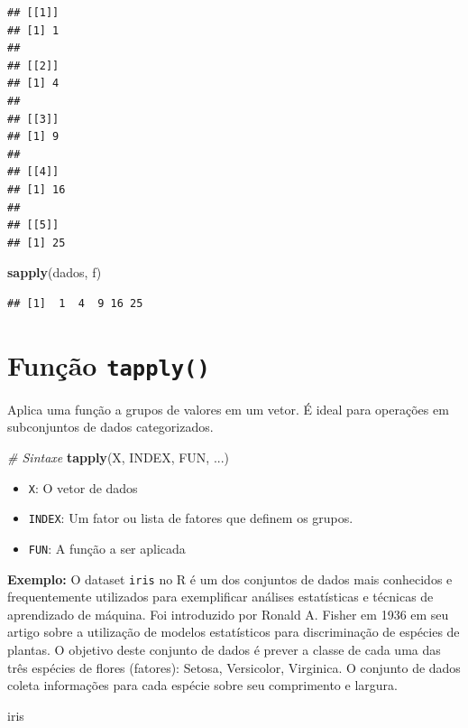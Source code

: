 \documentclass[
]{book}
\newenvironment{Shaded}{\begin{snugshade}}{\end{snugshade}}
\newcommand{\CommentTok}[1]{\textcolor[rgb]{0.56,0.35,0.01}{\textit{#1}}}
\newcommand{\FunctionTok}[1]{\textcolor[rgb]{0.13,0.29,0.53}{\textbf{#1}}}
\newcommand{\NormalTok}[1]{#1}
\begin{document}
\begin{verbatim}
## [[1]]
## [1] 1
## 
## [[2]]
## [1] 4
## 
## [[3]]
## [1] 9
## 
## [[4]]
## [1] 16
## 
## [[5]]
## [1] 25
\end{verbatim}

\begin{Shaded}
\begin{Highlighting}[]
\FunctionTok{sapply}\NormalTok{(dados, f)}
\end{Highlighting}
\end{Shaded}

\begin{verbatim}
## [1]  1  4  9 16 25
\end{verbatim}

\section{\texorpdfstring{Função \texttt{tapply()}}{Função tapply()}}\label{funuxe7uxe3o-tapply}

Aplica uma função a grupos de valores em um vetor. É ideal para operações em subconjuntos de dados categorizados.

\begin{Shaded}
\begin{Highlighting}[]
\CommentTok{\# Sintaxe}
\FunctionTok{tapply}\NormalTok{(X, INDEX, FUN, ...)}
\end{Highlighting}
\end{Shaded}

\begin{itemize}
\item
  \texttt{X}: O vetor de dados
\item
  \texttt{INDEX}: Um fator ou lista de fatores que definem os grupos.
\item
  \texttt{FUN}: A função a ser aplicada
\end{itemize}

\textbf{Exemplo:} O dataset \texttt{iris} no R é um dos conjuntos de dados mais conhecidos e frequentemente utilizados para exemplificar análises estatísticas e técnicas de aprendizado de máquina. Foi introduzido por Ronald A. Fisher em 1936 em seu artigo sobre a utilização de modelos estatísticos para discriminação de espécies de plantas. O objetivo deste conjunto de dados é prever a classe de cada uma das três espécies de flores (fatores): Setosa, Versicolor, Virginica. O conjunto de dados coleta informações para cada espécie sobre seu comprimento e largura.

\begin{Shaded}
\begin{Highlighting}[]
\NormalTok{iris}
\end{Highlighting}
\end{Shaded}
\end{document}
